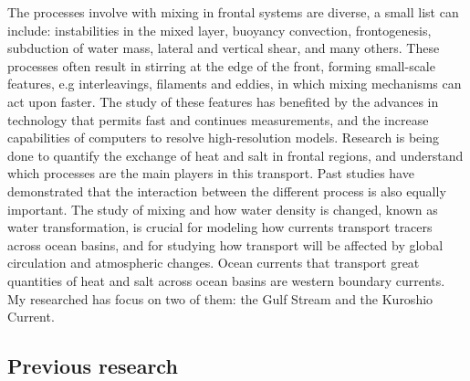 \documentclass[letterpaper, 12pt ]{article}
\begin{document}
    The processes involve with mixing in frontal systems are diverse, a small list can include: instabilities in the mixed layer, buoyancy convection, frontogenesis, subduction of water mass, lateral and vertical shear, and many others. These processes often result in stirring at the edge of the front, forming small-scale features, e.g interleavings, filaments and eddies, in which mixing mechanisms can act upon faster. The study of these features has benefited by the advances in technology that permits fast and continues measurements, and the increase capabilities of computers to resolve high-resolution models. Research is being done to quantify the exchange of heat and salt in frontal regions, and understand which processes are the main players in this transport. Past studies have demonstrated that the interaction between the different process is also equally important. The study of mixing and how water density is changed, known as water transformation, is crucial for modeling how currents transport tracers across ocean basins, and for studying  how transport will be affected by global circulation and atmospheric changes. Ocean currents that transport great quantities of heat and salt across ocean basins are western boundary currents. My researched has focus on two of them: the Gulf Stream and the Kuroshio Current.
    
    

 \subsection*{Previous research}  
    
\end{document}
